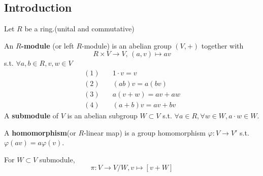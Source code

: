 \subsection{Introduction}
Let  $ R  $ be a ring.(unital and commutative)
\begin{definition}
    An  \textbf{$ R $-module} (or  left $ R $-module) is an abelian  group  $ (V,+) $ together with 
    \[R\times V\rightarrow V,\, (a,v)\mapsto av\tag{Scalar multiplication}\]
    s.t.  $ \forall a,b\in R,v,w\in V $
    \begin{align*}
        (1)&\quad 1\cdot v=v\\
        (2)&\quad (ab)v=a(bv)\\
        (3)&\quad a(v+w)=av+aw\\
        (4)&\quad (a+b)v=av+bv
    \end{align*} 
    A \textbf{submodule} of  $ V $ is an abelian subgroup  $ W\subset V $ s.t.  $ \forall a\in R,\forall w\in W, a\cdot w\in W $.  
\end{definition}
\begin{definition}
    A \textbf{homomorphism}(or  $ R $-linear map) is a group homomorphism  $ \varphi:V\rightarrow V' $ s.t.  $ \varphi(av)=a\varphi(v) $.  
\end{definition}
\begin{definition}
    For  $ W\subset V $ submodule,
    \[ \pi:V\rightarrow V/W, v\mapsto [v+W] \] 
\end{definition}